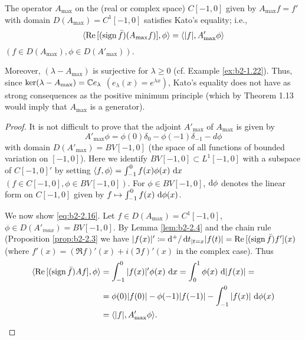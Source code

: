 \begin{example}\label{ex:b2-2.12}
The operator $A_{\max}$ on the (real or complex space) $C[-1,0]$ given by $A_{\max}f = f'$ with domain $D(A_{\max}) = C^{1}[-1,0]$ satisfies Kato's equality; i.e.,
\begin{equation}\label{eq:b2-2.16}
\langle \mathop{}\!\mathrm{Re}\,[(\operatorname{sign} \bar{f})(A_{\max}f)],\phi \rangle = \langle |f|,A'_{\max}\phi \rangle
\end{equation}
$(f \in D(A_{\max}), \phi \in D(A'_{\max}))$.

Moreover, $(\lambda - A_{\max})$ is surjective for $\lambda \geq 0$ (cf. Example  \ref{ex:b2-1.22}).
Thus, since $\ker(\lambda-A_{\max}) = \mathbb{C} e_{\lambda}$ $(e_{\lambda}(x) = e^{\lambda x})$, Kato's equality does not have as strong consequences as the positive minimum principle (which by Theorem 1.13 would imply that $A_{\max}$ is a generator).
\end{example}

\begin{proof}
It is not difficult to prove that the adjoint $A'_{\max}$ of $A_{\max}$ is given by
\begin{equation}\label{eq:b2-2.17}
A'_{\max}\phi = \phi(0)\delta_{0} - \phi(-1)\delta_{-1} - d\phi
\end{equation}
with domain $D(A'_{\max}) = BV[-1,0]$ (the space of all functions of bounded variation on $[-1,0]$).
Here we identify $BV[-1,0] \subset L^{1}[-1,0]$ with a subspace of $C[-1,0]'$ by setting $\langle f,\phi \rangle = \int_{-1}^{0} f(x)\phi(x)\,\mathop{}\!\mathrm{d}{x}$ $(f \in C[-1,0], \phi \in BV[-1,0])$.
For $\phi \in BV[-1,0]$, $\mathop{}\!\mathrm{d}{\phi}$ denotes the linear form on $C[-1,0]$ given by $f \mapsto \int_{-1}^{0} f(x)\, \mathop{}\!\mathrm{d}{\phi(x)}$.

We now show \eqref{eq:b2-2.16}.
Let $f \in D(A_{\max}) = C^{1}[-1,0]$, $\phi \in D(A'_{max}) =  BV[-1,0]$.
By Lemma \ref{lem:b2-2.4} and the chain rule (Proposition \ref{prop:b2-2.3} we have 
$|f(x)|' \coloneqq \mathop{}\!\mathrm{d}{^{+}}/\mathop{}\!\mathrm{d}{t}_{|t=x}|f(t)| = \mathop{}\!\mathrm{Re}\,[(\operatorname{sign} \bar{f})f'](x)$ (where $f'(x) = (\Re f)'(x) + i(\Im f)'(x)$ in the complex case).
Thus
\begin{align*}
\langle \mathop{}\!\mathrm{Re}\,[(\operatorname{sign} \bar{f})Af],\phi \rangle &= \int_{-1}^{0} |f(x)|'\phi(x)\, \mathop{}\!\mathrm{d}{x} = \int_{0}^{1} \phi(x)\, \mathop{}\!\mathrm{d}{|f(x)|} = \\
&= \phi(0)|f(0)| - \phi(-1)|f(-1)| - \int_{-1}^{0} |f(x)|\,\mathop{}\!\mathrm{d}{\phi(x)}  \\
&= \langle |f|,A'_{\max}\phi \rangle.
\end{align*}
\end{proof}

